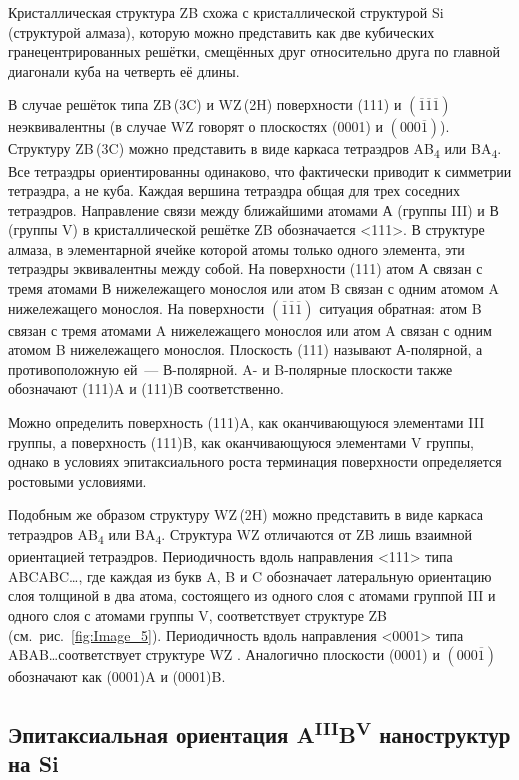 Кристаллическая структура ZB схожа с кристаллической структурой Si (структурой
алмаза), которую можно представить как две кубических гранецентрированных
решётки, смещённых друг относительно друга по главной диагонали куба на
четверть её длины.

В случае решёток типа ZB\,(3C) и WZ\,(2H) поверхности (111) и
\((\overline{1}\overline{1}\overline{1})\) неэквивалентны (в случае WZ говорят
о плоскостях (0001) и \((000\overline{1})\)). Структуру ZB\,(3C) можно
представить в виде каркаса тетраэдров AB\textsubscript{4} или
BA\textsubscript{4}. Все тетраэдры ориентированны одинаково, что фактически
приводит к симметрии тетраэдра, а не куба. Каждая вершина тетраэдра общая для
трех соседних тетраэдров. Направление связи между ближайшими атомами А (группы
III) и В (группы V) в кристаллической решётке ZB обозначается <111>. В
структуре алмаза, в элементарной ячейке которой атомы только одного элемента,
эти тетраэдры эквивалентны между собой. На поверхности (111) атом А связан с
тремя атомами В нижележащего монослоя или атом B связан с одним атомом A
нижележащего монослоя. На поверхности
\((\overline{1}\overline{1}\overline{1})\) ситуация обратная: атом B связан с
тремя атомами A нижележащего монослоя или атом A связан с одним атомом B
нижележащего монослоя. Плоскость (111) называют А-полярной, а противоположную
ей~--- В-полярной. A- и B-полярные плоскости также обозначают (111)A и (111)B
соответственно.

Можно определить поверхность (111)A, как оканчивающуюся элементами III группы,
а поверхность (111)B, как оканчивающуюся элементами V группы, однако в условиях
эпитаксиального роста терминация поверхности определяется ростовыми условиями.

Подобным же образом структуру WZ\,(2H) можно представить в виде каркаса
тетраэдров AB\textsubscript{4} или BA\textsubscript{4}. Структура WZ отличаются
от ZB лишь взаимной ориентацией тетраэдров. Периодичность вдоль направления
<111> типа ABCABC\dots, где каждая из букв A, B и C обозначает латеральную
ориентацию слоя толщиной в два атома, состоящего из одного слоя с атомами
группой III и одного слоя с атомами группы V, соответствует структуре ZB
(см.~рис.~\cref{fig:Image_5}). Периодичность вдоль направления <0001> типа
ABAB\dots соответствует структуре WZ \cite{Kriegner2011}. Аналогично плоскости
(0001) и \((000\overline{1})\) обозначают как (0001)A и (0001)B.

\subsection{Эпитаксиальная ориентация
A\textsuperscript{III}B\textsuperscript{V} наноструктур на
Si}\label{subsec:ch1/sec2/sub4}

